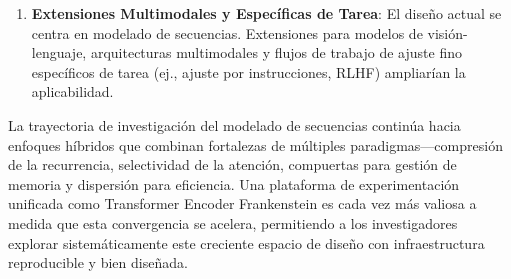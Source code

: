 \begin{enumerate}[leftmargin=*]
    \item \textbf{Extensiones Multimodales y Específicas de Tarea}: El diseño actual se centra en modelado de secuencias. Extensiones para modelos de visión-lenguaje, arquitecturas multimodales y flujos de trabajo de ajuste fino específicos de tarea (ej., ajuste por instrucciones, RLHF) ampliarían la aplicabilidad.
\end{enumerate}

La trayectoria de investigación del modelado de secuencias continúa hacia enfoques híbridos que combinan fortalezas de múltiples paradigmas---compresión de la recurrencia, selectividad de la atención, compuertas para gestión de memoria y dispersión para eficiencia. Una plataforma de experimentación unificada como Transformer Encoder Frankenstein es cada vez más valiosa a medida que esta convergencia se acelera, permitiendo a los investigadores explorar sistemáticamente este creciente espacio de diseño con infraestructura reproducible y bien diseñada.

